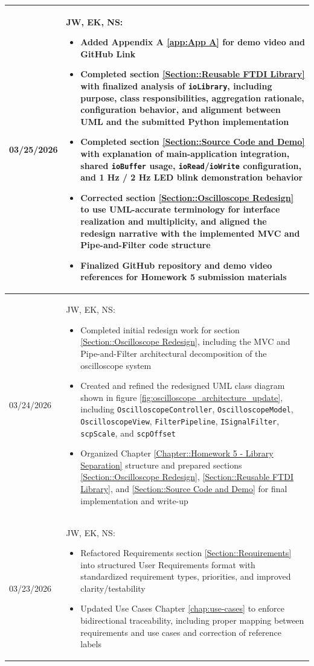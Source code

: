 \begin{longtable}{|l||p{13.5cm}|}
03/25/2026 & 
JW, EK, NS:
\begin{itemize}[topsep=0pt,itemsep=0pt,parsep=0pt,partopsep=0pt,leftmargin=12pt]
\item Added Appendix A \ref{app:App A} for demo video and GitHub Link
\item Completed section \ref{Section::Reusable FTDI Library} with finalized analysis of \texttt{ioLibrary}, including purpose, class responsibilities, aggregation rationale, configuration behavior, and alignment between UML and the submitted Python implementation
\item Completed section \ref{Section::Source Code and Demo} with explanation of main-application integration, shared \texttt{ioBuffer} usage, \texttt{ioRead}/\texttt{ioWrite} configuration, and 1 Hz / 2 Hz LED blink demonstration behavior
\item Corrected section \ref{Section::Oscilloscope Redesign} to use UML-accurate terminology for interface realization and multiplicity, and aligned the redesign narrative with the implemented MVC and Pipe-and-Filter code structure
\item Finalized GitHub repository and demo video references for Homework 5 submission materials
\end{itemize}
\\ \hline

03/24/2026 & 
JW, EK, NS:
\begin{itemize}[topsep=0pt,itemsep=0pt,parsep=0pt,partopsep=0pt,leftmargin=12pt]
\item Completed initial redesign work for section \ref{Section::Oscilloscope Redesign}, including the MVC and Pipe-and-Filter architectural decomposition of the oscilloscope system
\item Created and refined the redesigned UML class diagram shown in figure \ref{fig:oscilloscope_architecture_update}, including \texttt{OscilloscopeController}, \texttt{OscilloscopeModel}, \texttt{OscilloscopeView}, \texttt{FilterPipeline}, \texttt{ISignalFilter}, \texttt{scpScale}, and \texttt{scpOffset}
\item Organized Chapter \ref{Chapter::Homework 5 - Library Separation} structure and prepared sections \ref{Section::Oscilloscope Redesign}, \ref{Section::Reusable FTDI Library}, and \ref{Section::Source Code and Demo} for final implementation and write-up
\end{itemize}
\\ \hline

03/23/2026 & 
JW, EK, NS:
\begin{itemize}[topsep=0pt,itemsep=0pt,parsep=0pt,partopsep=0pt,leftmargin=12pt]
\item Refactored Requirements section \ref{Section::Requirements} into structured User Requirements format with standardized requirement types, priorities, and improved clarity/testability
\item Updated Use Cases Chapter \ref{chap:use-cases} to enforce bidirectional traceability, including proper mapping between requirements and use cases and correction of reference labels
\end{itemize}
\\ \hline


\end{longtable}
